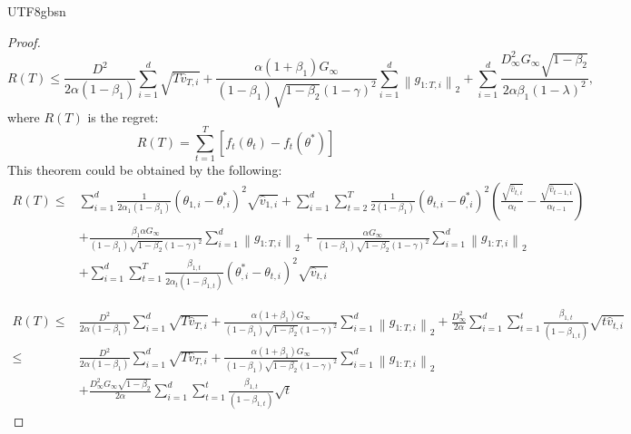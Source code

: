 \documentclass{article}
\theoremstyle{plain}
\theoremstyle{definition}
\theoremstyle{remark}
\begin{document}
\begin{CJK}{UTF8}{gbsn}
\begin{proof}
\begin{equation}
	R(T) \leq \frac{D^2}{2 \alpha\left(1-\beta_1\right)} \sum_{i=1}^d \sqrt{T \widehat{v}_{T, i}}+\frac{\alpha\left(1+\beta_1\right) G_{\infty}}{\left(1-\beta_1\right) \sqrt{1-\beta_2}(1-\gamma)^2} \sum_{i=1}^d\left\|g_{1: T, i}\right\|_2+\sum_{i=1}^d \frac{D_{\infty}^2 G_{\infty} \sqrt{1-\beta_2}}{2 \alpha \beta_1(1-\lambda)^2},
\end{equation}
where $R(T)$ is the regret:
\begin{equation}\label{eq:regret}
	R(T) = \sum_{t=1}^{T} [f_t(\theta_t)-f_t(\theta^*)]
\end{equation}
This theorem could be obtained by the following:
\begin{equation}
	\begin{aligned}\label{eq1}
		R(T) \leq & \sum_{i=1}^d \frac{1}{2 \alpha_1\left(1-\beta_1\right)}\left(\theta_{1, i}-\theta_{, i}^*\right)^2 \sqrt{\widehat{v}_{1, i}}+\sum_{i=1}^d \sum_{t=2}^T \frac{1}{2\left(1-\beta_1\right)}\left(\theta_{t, i}-\theta_{, i}^*\right)^2\left(\frac{\sqrt{\widehat{v}_{t, i}}}{\alpha_t}-\frac{\sqrt{\widehat{v}_{t-1, i}}}{\alpha_{t-1}}\right) \\
		& +\frac{\beta_1 \alpha G_{\infty}}{\left(1-\beta_1\right) \sqrt{1-\beta_2}(1-\gamma)^2} \sum_{i=1}^d\left\|g_{1: T, i}\right\|_2+\frac{\alpha G_{\infty}}{\left(1-\beta_1\right) \sqrt{1-\beta_2}(1-\gamma)^2} \sum_{i=1}^d\left\|g_{1: T, i}\right\|_2 \\
		& +\sum_{i=1}^d \sum_{t=1}^T \frac{\beta_{1, t}}{2 \alpha_t\left(1-\beta_{1, t}\right)}\left(\theta_{, i}^*-\theta_{t, i}\right)^2 \sqrt{\widehat{v}_{t, i}}
	\end{aligned}
\end{equation}

\begin{equation}
	\begin{aligned}\label{eq2}
		R(T) \leq & \frac{D^2}{2 \alpha\left(1-\beta_1\right)} \sum_{i=1}^d \sqrt{T \widehat{v}_{T, i}}+\frac{\alpha\left(1+\beta_1\right) G_{\infty}}{\left(1-\beta_1\right) \sqrt{1-\beta_2}(1-\gamma)^2} \sum_{i=1}^d\left\|g_{1: T, i}\right\|_2+\frac{D_{\infty}^2}{2 \alpha} \sum_{i=1}^d \sum_{t=1}^t \frac{\beta_{1, t}}{\left(1-\beta_{1, t}\right)} \sqrt{t \widehat{v}_{t, i}} \\
		\leq & \frac{D^2}{2 \alpha\left(1-\beta_1\right)} \sum_{i=1}^d \sqrt{T \widehat{v}_{T, i}}+\frac{\alpha\left(1+\beta_1\right) G_{\infty}}{\left(1-\beta_1\right) \sqrt{1-\beta_2}(1-\gamma)^2} \sum_{i=1}^d\left\|g_{1: T, i}\right\|_2 \\
		& +\frac{D_{\infty}^2 G_{\infty} \sqrt{1-\beta_2}}{2 \alpha} \sum_{i=1}^d \sum_{t=1}^t \frac{\beta_{1, t}}{\left(1-\beta_{1, t}\right)} \sqrt{t}
	\end{aligned}
\end{equation}


\end{proof}
\end{CJK}
\end{document}
